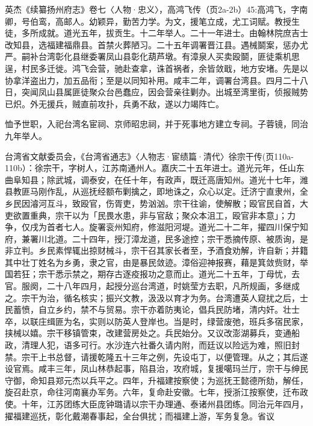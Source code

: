 
\noindent 英杰《续纂扬州府志》卷七〈人物·忠义〉，高鸿飞传（页2a-2b）45:高鸿飞，字南卿，号伯鸾，高邮人。幼颖异，勤苦力学。为文，援笔立成，尤工词赋。教授生徒，多所成就。道光五年，拔贡生。十二年举人。二十一年进士。由翰林院庶吉士改知县，选福建福鼎县。首禁火葬陋习。二十五年调署晋江县。遇械鬬案，惩办尤严。嗣补台湾彰化县继委署凤山县彰化葫芦墩。有漳泉人买卖殴鬬，匪徒乘机思逞，村民多迁徙。鸿飞会营，驰赴查拿，诛首祸者，余皆敛戢，地方安堵。先是以协拿洋盗出力，加五品衔；至是以同知补用。咸丰二年，调署台湾县。四月二十八日，突闻凤山县属匪徒聚众台邑蠢应，因会营亲往剿办。出城至湾里街，侦报贼势已炽。外无援兵，贼直前攻扑，兵勇不敌，遂以力竭阵亡。

\vfill
\begin{BookNotes}
\end{BookNotes}

\noindent 恤予世职，入祀台湾名宦祠、京师昭忠祠，并于死事地方建立专祠。子蓉镜，同治九年举人。


\noindent 台湾省文献委员会，《台湾省通志》〈人物志·宦绩篇·清代〉徐宗干传(页110a-110b）：徐宗干，字树人，江苏南通州人。嘉庆二十五年进士。道光元年，任山东曲阜知县；除武城，调泰安，在任十年，有政声，既迁高唐知州。道光十七年，潍县教匪马刚作乱，从巡抚经额布剿擒之，即地诛之，众心以定。迁济宁直隶州，全乡民因濬河互斗，致殴官，伤胥吏，势汹汹。宗干往谕，使解散；殴官民自首，大吏欲置重典，宗干以为「民畏水患，非与官敌；聚众本沮工，殴官非本意」；力争，仅戌为首者七人。旋署衮州知府，修滋阳河堤。道光二十二年，擢四川保宁知府，兼署川北道。二十四年，授汀漳龙道，民多途控；宗干悉摘传原、被质询，是非立判。乡民素悍辄出掠财械斗，宗干召其家长者至，予酒食劝解，许自新；并籍其中壮丁姓名为乡勇，隶之官，由是暴民敛迹。漳俗迎神报赛，藉是箕敛赀财，举国若狂；宗干悉示禁之，期存古逐疫报功之意而止。道光二十五年，丁母忧，去官。服阕，二十八年四月，起授分巡台湾道，时姚莹方去职，凡所规画，多继成之。宗干为治，循名核实；振兴文教，汲汲以育才为务。台湾遭英人窥扰之后，士民蓄愤，自立乡约，禁不与贸易。宗干亦着防夷论，倡兵民防堵，清内奸。壮士卒，以联庄缉匪为名，实则以防英人登岸也。当是时，绿营废弛，班兵多宿民家，挟械以嬉。宗干移镇管束，改建营房处之。兵民始分。又议改澎湖募兵，变通船政，清理人犯，语多可行。水沙连六社番久请内附，而廷议以险远为难，照旧封禁。宗干上书总督，请援乾隆五十三年之例，先设屯丁，以便管理。从之；其后遂设官焉。咸丰三年，凤山林恭起事，陷县治，攻府城，复援噶玛兰厅，宗干与绅民守御，命知县郑元杰以兵平之。四年，升福建按察使；为巡抚王懿德所劾，解任，旋召赴京，命往河南襄办军务。六年，复命赴安徽。七年，授浙江按察使，迁布政使。十年，江苏团练大臣庞钟璐请以宗干办理通、泰诸州县团练。同治元年四月，擢福建巡抚，彰化戴潮春事起，全台俱扰；而福建上游，军务复急。省议


